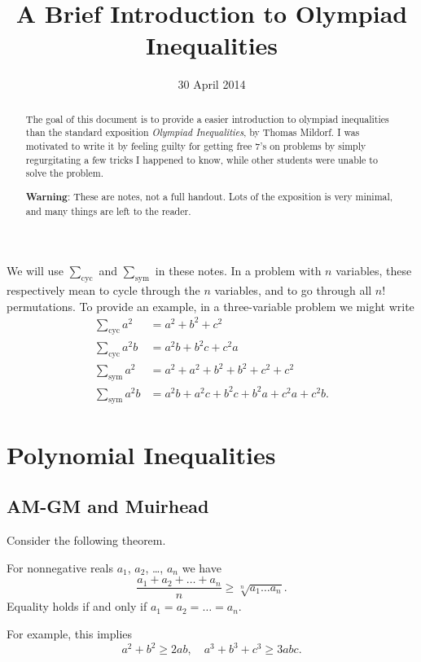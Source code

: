 \documentclass[11pt]{scrartcl}
\begin{document}
\title{A Brief Introduction to Olympiad Inequalities}
\date{30 April 2014}
\maketitle

\begin{abstract}
  The goal of this document is to provide a easier introduction to olympiad inequalities
  than the standard exposition \emph{Olympiad Inequalities}, by Thomas Mildorf.
  I was motivated to write it by feeling guilty for getting
  free $7$'s on problems by simply regurgitating a few tricks I happened to know,
  while other students were unable to solve the problem.

  \textbf{Warning}: These are notes, not a full handout.
  Lots of the exposition is very minimal, and many things are left to the reader.
\end{abstract}

We will use $\sum_{\text{cyc}}$ and $\sum_{\text{sym}}$ in these notes.
In a problem with $n$ variables, these respectively mean to cycle through the $n$ variables,
and to go through all $n!$ permutations.
To provide an example, in a three-variable problem we might write
\begin{align*}
  \sum_{\text{cyc}} a^2 &= a^2+b^2+c^2 \\
  \sum_{\text{cyc}} a^2b &= a^2b+b^2c+c^2a \\
  \sum_{\text{sym}} a^2 &= a^2+a^2+b^2+b^2+c^2+c^2 \\
  \sum_{\text{sym}} a^2b &= a^2b+a^2c+b^2c+b^2a+c^2a+c^2b.
\end{align*}

\section{Polynomial Inequalities}
\subsection{AM-GM and Muirhead}
Consider the following theorem.
\begin{theorem}
  [AM-GM] For nonnegative reals $a_1$, $a_2$, \dots, $a_n$ we have
  \[ \frac{a_1 + a_2 + \dots + a_n}{n} \ge \sqrt[n]{a_1 \dots a_n}. \]
  Equality holds if and only if $a_1 = a_2 = \dots = a_n$.
\end{theorem}
For example, this implies \[ a^2+b^2 \ge 2ab, \quad a^3+b^3+c^3 \ge 3abc. \]
\end{document}
